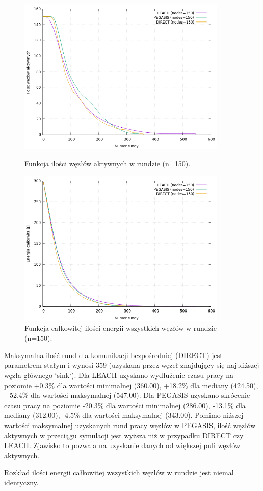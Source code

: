 \documentclass[a4paper,12pt,twoside,openany]{report}
\begin{document}
\begin{figure}[H]
 \centering
 \includegraphics[width=10cm]{images/gnuplot/test_2/nodes_in_round_150.png}
 \caption{Funkcja ilości węzłów aktywnych w rundzie (n=150).}
 \includegraphics[width=10cm]{images/gnuplot/test_2/energy_in_round_150.png}
 \caption{Funkcja całkowitej ilości energii wszystkich węzłów w rundzie (n=150).}
\end{figure}

\par
Maksymalna ilość rund dla komunikacji bezpośredniej (DIRECT) jest parametrem stałym i wynosi 359 (uzyskana przez węzeł znajdujący się najbliższej węzła głównego `sink`).
Dla LEACH uzyskano wydłużenie czasu pracy na poziomie +0.3\% dla wartości minimalnej (360.00), +18.2\% dla mediany (424.50), +52.4\% dla wartości maksymalnej (547.00).
Dla PEGASIS uzyskano skrócenie czasu pracy na poziomie -20.3\% dla wartości minimalnej (286.00), -13.1\% dla mediany (312.00), -4.5\% dla wartości maksymalnej (343.00).
Pomimo niższej wartości maksymalnej uzyskanych rund pracy węzłów w PEGASIS, ilość węzłów aktywnych w przeciągu symulacji jest wyższa niż w przypadku DIRECT czy LEACH.
Zjawisko to pozwala na uzyskanie danych od większej puli węzłów aktywnych.
\par
Rozkład ilości energii całkowitej wszystkich węzłów w rundzie jest niemal identyczny.
\end{document}
